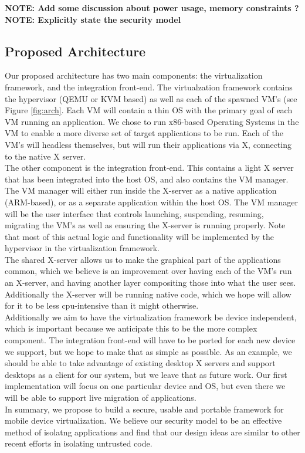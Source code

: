 {\bf NOTE: Add some discussion about power usage, memory constraints ? \newline}
{\bf NOTE: Explicitly state the security model \newline}

\subsection{Proposed Architecture}
\label{sec:proposedarch}
Our proposed architecture has two main components: the virtualization framework, and the integration front-end.  The virtualzation framework contains the hypervisor (QEMU or KVM based) as well as each of the spawned VM's (see Figure \ref{fig:arch}.  Each VM will contain a thin OS with the primary goal of each VM running an application.  We chose to run x86-based Operating Systems in the VM to enable a more diverse set of target applications to be run. Each of the VM's will headless themselves, but will run their applications via X, connecting to the native X server. \\

The other component is the integration front-end.  This contains a light X server that has been integrated into the host OS, and also contains the VM manager.  The VM manager will either run inside the X-server as a native application (ARM-based), or as a separate application within the host OS.  The VM manager will be the user interface that controls launching, suspending, resuming, migrating the VM's as well as ensuring the X-server is running properly. Note that most of this actual logic and functionality will be implemented by the hypervisor in the virtualization framework.\\

The shared X-server allows us to make the graphical part of the applications common, which we believe is an improvement over having each of the VM's run an X-server, and having another layer compositing those into what the user sees. Additionally the X-server will be running native code, which we hope will allow for it to be less cpu-intensive than it might otherwise. \\

Additionally we aim to have the virtualization framework be device independent, which is important because we anticipate this to be the more complex component.  The integration front-end will have to be ported for each new device we support, but we hope to make that as simple as possible.  As an example, we should be able to take advantage of existing desktop X servers and support desktops as a client for our system, but we leave that as future work.  Our first implementation will focus on one particular device and OS, but even there we will be able to support live migration of applications. \\

In summary, we propose to build a secure, usable and portable framework for mobile device virtualization. We believe our security model to be an effective method of isolatng applications and find that our design ideas are similar to other recent efforts \cite{grier2008secure} in isolating untrusted code.
